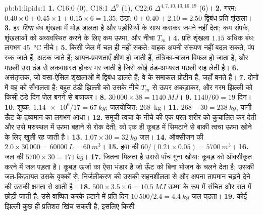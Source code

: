 \begin{solution}{pb:b1:lipids:1}
\textbf{1.} C16:0 (0), C18:1 $\Delta^9$ (1), C22:6 $\Delta^{4,7,10,13,16,19}$
(6)।
\textbf{2.} गरम: $0.40\times 0 + 0.45\times 1 + 0.15\times 6 = 1.35$;
ठंडा: $0 + 0.40 + 2.10 = 2.50$ द्विबंध प्रति शृंखला।
\textbf{3.} हर \emph{सिस} बंध शृंखला में मोड़ डालता है और पड़ोसियों के
साथ कसकर जमने नहीं देता; कम  संपर्क, शृंखलाओं को अव्यवस्थित
करने के लिए कम ऊष्मा, और नीचा $T_m$।
\textbf{4.} प्रति शृंखला $1.15$ अधिक बंध: लगभग \qty{45}{\celsius}
नीचे।
\textbf{5.} किसी जेल में  चल ही नहीं सकते: वाहक अपनी संरूपण नहीं
बदल सकते, पंप रुक जाते हैं,  अटक जाते हैं; आयन-प्रवणताएँ क्षीण हो
जाती हैं, तंत्रिका-चालन विफल हो जाता है, और मछली उस ठंड से लकवाग्रस्त
होकर मर जाती है जिसे कोई ठंड-अभ्यस्त मछली सह लेती है।
\textbf{6.} असंतृप्तक, जो वसा-ऐसिल शृंखलाओं में द्विबंध डालते हैं; वे
 के समाकल प्रोटीन हैं, जहाँ
 बनते हैं।
\textbf{7.} दोनों में वह  को सँभालता है: बहुत  ठंडी
झिल्ली को उसके नीचे $T_m$ से ऊपर अकड़ाकर, और गरम
झिल्ली को किसी ठंडे दिन जेल बनने से बचाकर।
\textbf{8.} $30\,000\times 38 = \qty{1140}{MJ}$।
\textbf{9.} $1140/60 = 19$ दिन।
\textbf{10.} शुष्क: $\num{1.14e6}/17 = \qty{67}{kg}$; जलयोजित:
\qty{268}{kg}।
\textbf{11.} $268 - 30 = \qty{238}{kg}$, यानी ऊँट के द्रव्यमान का लगभग आधा।
\textbf{12.} समूची त्वचा के नीचे  की एक परत शरीर को कुचालित कर देती
और उसे मरुस्थल में ऊष्मा बहाने से रोक देती;  को एक ही कूबड़ में
सिमटाने से बाकी त्वचा ऊष्मा खोने के लिए खुली रह जाती है।
\textbf{13.} $1.07\times 30 = \qty{32}{kg}$ जल।
\textbf{14.} ऑक्सीजन की $2.0\times 30\,000 = \qty{60000}{L} = \qty{60}{m^3}$।
\textbf{15.} हवा की $60/(0.21\times 0.05) = \qty{5700}{m^3}$।
\textbf{16.} जल की $5700\times 30 = \qty{171}{kg}$।
\textbf{17.} जितना मिलता है उससे पाँच गुना खोया: कूबड़ को ऑक्सीकृत करने
में जल पड़ता है। कूबड़ ऊर्जा का ऐसा भंडार है जो ऊँट को बिना भोजन के चलने
देता है; उसकी जल-किफ़ायत उसके वृक्कों से, निर्जलीकरण की उसकी सहनशीलता से
और अपना तापमान चढ़ने देने की उसकी क्षमता से आती है।
\textbf{18.} $500\times 3.5\times 6 = \qty{10.5}{MJ}$ ऊष्मा के रूप में संचित और रात में छोड़ी जाती है; उसे वाष्पित करके हटाने में प्रति दिन $10\,500/2.4 = \qty{4.4}{kg}$ जल पड़ता।
\textbf{19.} कोई झिल्ली कुछ ही प्रतिशत खिंच सकती है, इसलिए किसी

\end{solution}

